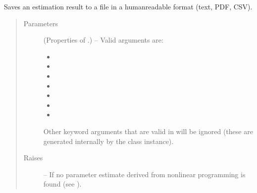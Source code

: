 \documentclass[letterpaper,10pt,english]{sphinxmanual}
\begin{document}
\begin{fulllineitems}
\begin{fulllineitems}
\end{fulllineitems}


\begin{fulllineitems}
\label{\detokenize{references/core:nmrespy.core.Estimator.write_result}}
\sphinxAtStartPar
Saves an estimation result to a file in a human\sphinxhyphen{}readable format
(text, PDF, CSV).
\begin{quote}\begin{description}
\item[{Parameters}] \leavevmode
\sphinxAtStartPar
{} (Properties of {\hyperref[\detokenize{references/write:nmrespy.write.write_result}]{}}.) – 
\sphinxAtStartPar
Valid arguments are:
\begin{itemize}
\item {} 
\sphinxAtStartPar
{}

\item {} 
\sphinxAtStartPar
{}

\item {} 
\sphinxAtStartPar
{}

\item {} 
\sphinxAtStartPar
{}

\item {} 
\sphinxAtStartPar
{}

\item {} 
\sphinxAtStartPar
{}

\item {} 
\sphinxAtStartPar
{}

\end{itemize}

\sphinxAtStartPar
Other keyword arguments that are valid in
{\hyperref[\detokenize{references/write:nmrespy.write.write_result}]{}} will be ignored (these are
generated internally by the class instance).


\item[{Raises}] \leavevmode
\sphinxAtStartPar
{\hyperref[\detokenize{references/errors:nmrespy._errors.AttributeIsNoneError}]{}} – If no parameter estimate derived from nonlinear programming
    is found (see {\hyperref[\detokenize{references/core:nmrespy.core.Estimator.nonlinear_programming}]{}}).


\end{description}
\end{quote}
\end{fulllineitems}
\end{fulllineitems}
\end{document}
